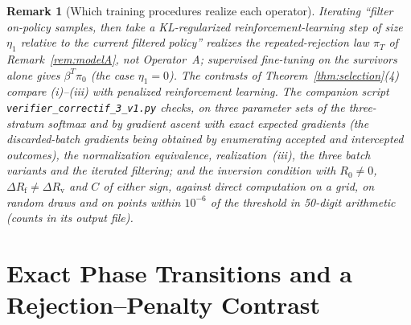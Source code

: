 \documentclass[11pt,a4paper]{article}
\newtheorem{remark}[theorem]{Remark}
\begin{document}
\begin{remark}[Which training procedures realize each operator]
Iterating ``filter on-policy samples, then take a KL-regularized reinforcement-learning step of size $\eta_1$ relative to the current filtered policy'' realizes the repeated-rejection law $\pi_T$ of Remark~\ref{rem:modelA}, not Operator~A; supervised fine-tuning on the survivors alone gives $\beta^T\pi_0$ (the case $\eta_1 = 0$).
The contrasts of Theorem~\ref{thm:selection}(4) compare (i)--(iii) with penalized reinforcement learning. The companion script \texttt{verifier\_correctif\_3\_v1.py} checks, on three parameter sets of the three-stratum softmax and by gradient ascent with exact expected gradients (the discarded-batch gradients being obtained by enumerating accepted and intercepted outcomes), the normalization equivalence, realization~(iii), the three batch variants and the iterated filtering; and the inversion condition with $R_0 \neq 0$, $\Delta R_{\mathrm{f}} \neq \Delta R_{\mathrm{v}}$ and $C$ of either sign, against direct computation on a grid, on random draws and on points within $10^{-6}$ of the threshold in 50-digit arithmetic (counts in its output file).
\end{remark}

\section{Exact Phase Transitions and a Rejection--Penalty Contrast}
\end{document}
